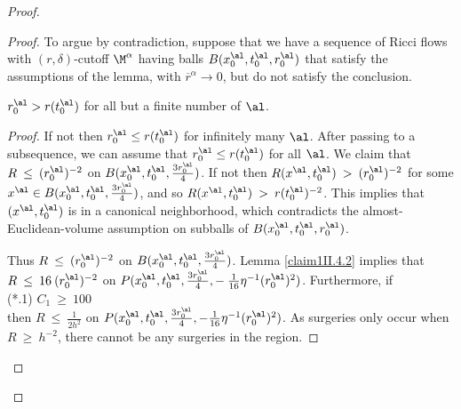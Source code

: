 \begin{proof}
\begin{proof}
To argue by contradiction,
suppose that we have a sequence of
Ricci flows with $(r, \delta)$-cutoff $\M^\alpha$ having
balls $B(x_0^\al, t_0^\al, r_0^\al)$ that
satisfy the assumptions of the lemma, with $\overline{r}^\alpha
\rightarrow 0$, but do not satisfy the conclusion.

\begin{lemma}
  \label{lem:kl-earlier-scalar-curvature-bounds-smaller-balls-from-lower-curvature-bound-scalar-curvature-lemma}

$r_0^\al > r(t_0^\al)$ for all but a finite number of $\al$.
\end{lemma}
\begin{proof}
If not then $r_0^\al \le r(t_0^\al)$ for
infinitely many
$\al$. After passing to a subsequence, we can assume
that $r_0^\al \le r(t_0^\al)$ for all $\al$. We  claim that
$R \: \le \: (r_0^\al)^{-2}$ on $B(x_0^\al, t_0^\al, \frac{3r_0^\al}{4})$.
If not then $R(x^\al, t_0^\al) \: > \: (r_0^\al)^{-2}$ for some
$x^\al \in B(x_0^\al, t_0^\al, \frac{3r_0^\al}{4})$, and so
$R(x^\al, t_0^\al) \: > \: r(t_0^\al)^{-2}$.
This implies that
$(x^\al, t_0^\al)$ is in a canonical neighborhood, which
contradicts the almost-Euclidean-volume assumption on subballs of
$B(x_0^\al, t_0^\al, r_0^\al)$.

Thus $R \: \le \: (r_0^\al)^{-2}$ on
$B(x_0^\al, t_0^\al, \frac{3r_0^\al}{4})$.
Lemma \ref{claim1II.4.2}
implies that
$R \: \le \: 16 \: (r_0^\al)^{-2}$ on
$P(x^\al_0, t^\al_0,  \frac{3r_0^\al}{4},
- \: \frac{1}{16} \eta^{-1} (r_0^\al)^2)$.
Furthermore, if \\
(*.1) $C_1 \: \ge \: 100$ \\
then $R \: \le \: \frac{1}{2 h^2}$ on $P(x_0^\al, t_0^\al, \frac{3r_0^\al}{4},
- \frac{1}{16} \eta^{-1} (r_0^\al)^2)$.
As surgeries only occur when $R \: \ge \: h^{-2}$,
there cannot be any surgeries in the region.


\end{proof}
\end{proof}
\end{proof}
